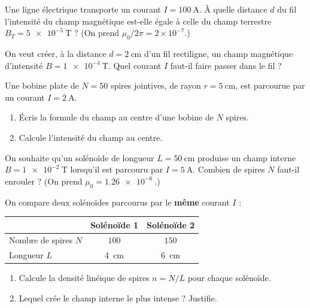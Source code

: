 \documentclass[11pt,a4paper]{article}
\begin{document}
\begin{exo}
Une ligne électrique transporte un courant $I=\qty{100}{\ampere}$. À quelle distance $d$ du fil
l'intensité du champ magnétique est-elle égale à celle du champ terrestre
$B_T=\qty{5e-5}{\tesla}$ ? (On prend $\mu_0/2\pi=2\times10^{-7}$.)
\end{exo}

\begin{exo}
On veut créer, à la distance $d=\qty{2}{\centi\metre}$ d'un fil rectiligne, un champ magnétique
d'intensité $B=\qty{1e-4}{\tesla}$. Quel courant $I$ faut-il faire passer dans le fil ?
\end{exo}

\begin{exo}
Une bobine plate de $N=50$ spires jointives, de rayon $r=\qty{5}{\centi\metre}$, est parcourue par
un courant $I=\qty{2}{\ampere}$.
\begin{enumerate}[label=\alph*)]
  \item Écris la formule du champ au centre d'une bobine de $N$ spires.
  \item Calcule l'intensité du champ au centre.
\end{enumerate}
\end{exo}

\begin{exo}
On souhaite qu'un solénoïde de longueur $L=\qty{50}{\centi\metre}$ produise un champ interne
$B=\qty{1e-2}{\tesla}$ lorsqu'il est parcouru par $I=\qty{5}{\ampere}$. Combien de spires $N$
faut-il enrouler ? (On prend $\mu_0=\qty{1.26e-6}{}$.)
\end{exo}

\begin{exo}
On compare deux solénoïdes parcourus par le \textbf{même} courant $I$ :
\begin{center}
\renewcommand{\arraystretch}{1.2}
\begin{tabular}{@{}lcc@{}}
\toprule
 & Solénoïde 1 & Solénoïde 2 \\ \midrule
Nombre de spires $N$ & $100$ & $150$ \\
Longueur $L$ & \qty{4}{\centi\metre} & \qty{6}{\centi\metre} \\ \bottomrule
\end{tabular}
\end{center}
\begin{enumerate}[label=\alph*)]
  \item Calcule la densité linéique de spires $n=N/L$ pour chaque solénoïde.
  \item Lequel crée le champ interne le plus intense ? Justifie.
\end{enumerate}
\end{exo}
\end{document}
